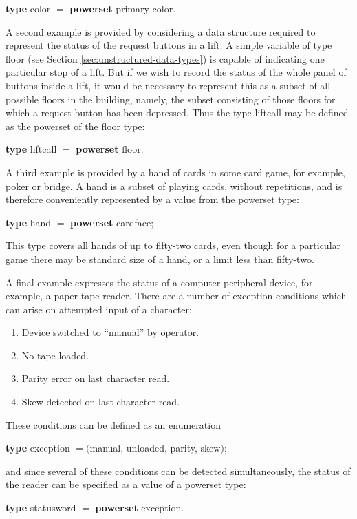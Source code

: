 \quad \textbf{type} color $=$ \textbf{powerset} primary color.

A second example is provided by considering a data structure required to represent the status of the request buttons in a lift. A simple variable of type floor (see Section \ref{sec:unstructured-data-types}) is capable of indicating one particular stop of a lift.  But if we wish to record the status of the whole panel of buttons inside a lift, it would be necessary to represent this as a subset of all possible floors in the building, namely, the subset consisting of those floors for which a request button has been depressed. Thus the type liftcall may be defined as the powerset of the floor type:

\quad \textbf{type} liftcall $=$ \textbf{powerset} floor.

A third example is provided by a hand of cards in some card game, for example, poker or bridge. A hand is a subset of playing cards, without repetitions, and is therefore conveniently represented by a value from the powerset type:

\quad \textbf{type} hand $=$ \textbf{powerset} cardface;

\noindent
This type covers all hands of up to fifty-two cards, even though for a particular game there may be standard size of a hand, or a limit less than fifty-two.

A final example expresses the status of a computer peripheral device, for example, a paper tape reader. There are a number of exception conditions which can arise on attempted input of a character:

\begin{enumerate}[wide, nosep, label=(\arabic*)]
	\item Device switched to ``manual'' by operator.
	\item No tape loaded.
	\item Parity error on last character read.
	\item Skew detected on last character read.
\end{enumerate}

\noindent
These conditions can be defined as an enumeration

\quad \textbf{type} exception $= ($manual, unloaded, parity, skew$)$; 

\noindent
and since several of these conditions can be detected simultaneously, the status of the reader can be specified as a value of a powerset type:

\quad \textbf{type} statusword $=$ \textbf{powerset} exception.

